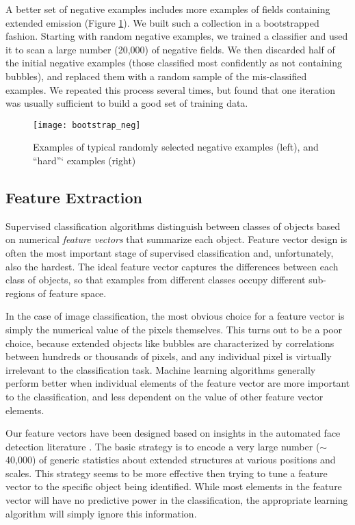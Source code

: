 \documentclass[preprint]{aastex}
\begin{document}
A better set of negative examples includes more examples of fields containing extended emission (Figure \ref{fig:bootstrap_neg}). We built such a collection in a bootstrapped fashion. Starting with random negative examples, we trained a classifier and used it to scan a large number (20,000) of negative fields. We then discarded half of the initial negative examples (those classified most confidently as not containing bubbles), and replaced them with a random sample of the mis-classified examples. We repeated this process several times, but found that one iteration was usually sufficient to build a good set of training data.

\begin{figure}
\texttt{[image: bootstrap\_neg]}
\caption{Examples of typical randomly selected negative examples (left), and ``hard''` examples (right)}
\label{fig:bootstrap_neg}
\end{figure}

\subsection{Feature Extraction}
\label{sec:method_feature_extraction}
Supervised classification algorithms distinguish between classes of objects based on numerical \textit{feature vectors} that summarize each object. Feature vector design is often the most important stage of supervised classification and, unfortunately, also the hardest. The ideal feature vector captures the differences between each class of objects, so that examples from different classes occupy different sub-regions of feature space. 

In the case of image classification, the most obvious choice for a feature vector is simply the numerical value of the pixels themselves. This turns out to be a poor choice, because extended objects like bubbles are characterized by correlations between hundreds or thousands of pixels, and any individual pixel is virtually irrelevant to the classification task. Machine learning algorithms generally perform better when individual elements of the feature vector are more important to the classification, and less dependent on the value of other feature vector elements.

Our feature vectors have been designed based on insights in the automated face detection literature \citep{ViolaJones}.  The basic strategy is to encode a very large number ($\sim$40,000) of generic statistics about extended structures at various positions and scales. This strategy seems to be more effective then trying to tune a feature vector to the specific object being identified. While most elements in the feature vector will have no predictive power in the classification, the appropriate learning algorithm will simply ignore this information.
\end{document}
